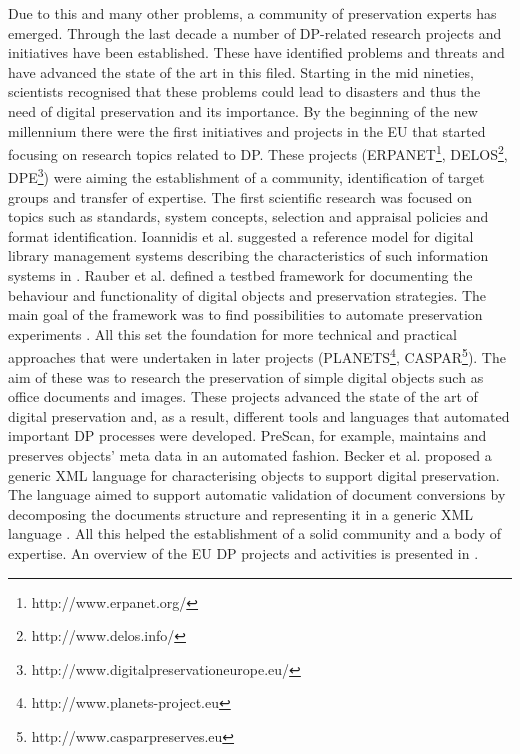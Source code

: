 Due to this and many other problems, a community of preservation experts has emerged.
Through the last decade a number of DP-related research projects and initiatives have been established.
These have identified problems and threats and have advanced the state of the art in this filed.
Starting in the mid nineties, scientists recognised that these problems could lead to disasters and thus the need of digital preservation and its importance.
By the beginning of the new millennium there were the first initiatives and projects in the EU that started focusing on research topics related to DP. These projects (ERPANET\footnote{http://www.erpanet.org/}, DELOS\footnote{http://www.delos.info/}, DPE\footnote{http://www.digitalpreservationeurope.eu/}) were aiming the establishment of a community, identification of target groups and transfer of expertise.
The first scientific research was focused on topics such as standards, system concepts, selection and appraisal policies and format identification. Ioannidis et al. suggested a reference model for digital library management systems describing the characteristics of such information systems in \cite{delos:refdlms}. Rauber et al. defined a testbed framework for documenting the behaviour and functionality of digital objects and preservation strategies. The main goal of the framework was to find possibilities to automate preservation experiments \cite{delos:frmdoc}. All this set the foundation for more technical and practical approaches that were undertaken in later projects (PLANETS\footnote{http://www.planets-project.eu}, CASPAR\footnote{http://www.casparpreserves.eu}). The aim of these was to research the preservation of simple digital objects such as office documents and images. These projects advanced the state of the art of digital preservation and, as a result, different tools and languages that automated important DP processes were developed. PreScan, for example, maintains and preserves objects' meta data in an automated fashion\cite{Marketakis:2009fk}. Becker et al. proposed a generic XML language for characterising objects to support digital preservation. The language aimed to support automatic validation of document conversions by decomposing the documents structure and representing it in a generic XML language \cite{Becker:2008uq}.
All this helped the establishment of a solid community and a body of expertise.
An overview of the EU DP projects and activities is presented in \cite{strodl:2011:dpreport}.

